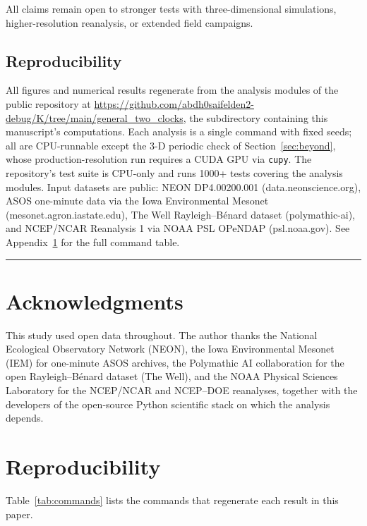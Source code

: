 \documentclass[11pt]{article}
\begin{document}
All claims remain open to stronger tests with three-dimensional simulations, higher-resolution reanalysis, or extended field campaigns.

\subsection{Reproducibility}

All figures and numerical results regenerate from the analysis modules of the public repository at \url{https://github.com/abdh0saifelden2-debug/K/tree/main/general_two_clocks}, the subdirectory containing this manuscript's computations. Each analysis is a single command with fixed seeds; all are CPU-runnable except the 3-D periodic check of Section~\ref{sec:beyond}, whose production-resolution run requires a CUDA GPU via \texttt{cupy}. The repository's test suite is CPU-only and runs 1000+ tests covering the analysis modules. Input datasets are public: NEON DP4.00200.001 (data.\allowbreak neonscience.org), ASOS one-minute data via the Iowa Environmental Mesonet (mesonet.\allowbreak agron.\allowbreak iastate.edu), The Well Rayleigh--B\'enard dataset (polymathic-ai), and NCEP/NCAR Reanalysis 1 via NOAA PSL OPeNDAP (psl.\allowbreak noaa.gov). See Appendix~\ref{app:reproducibility} for the full command table.

\medskip\hrule\medskip

\section*{Acknowledgments}

This study used open data throughout. The author thanks the National Ecological Observatory Network (NEON), the Iowa Environmental Mesonet (IEM) for one-minute ASOS archives, the Polymathic AI collaboration for the open Rayleigh--B\'enard dataset (The Well), and the NOAA Physical Sciences Laboratory for the NCEP/NCAR and NCEP--DOE reanalyses, together with the developers of the open-source Python scientific stack on which the analysis depends.

\appendix

\section{Reproducibility}
\label{app:reproducibility}

Table~\ref{tab:commands} lists the commands that regenerate each result in this paper.
\end{document}
